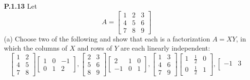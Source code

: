 \documentclass[12pt]{amsart}
\begin{document}
\begin{onehalfspace}
        \noindent\textbf{P.1.13} Let
        \begin{displaymath}
            A = \left[
                \begin{matrix}
                    1 & 2 & 3 \\
                    4 & 5 & 6 \\
                    7 & 8 & 9
                \end{matrix}
            \right]
        \end{displaymath}
        (a) Choose two of the following and show that each is a factorization $A = XY$, in which the columns of $X$ and
        rows of $Y$ are each linearly independent:
        \begin{displaymath}
            \left[\begin{matrix}
                      1 & 2 \\
                      4 & 5 \\
                      7 & 8
            \end{matrix}\right]
            \left[\begin{matrix}
                      1 & 0 & -1 \\
                      0 & 1 & 2
            \end{matrix}\right],
            \left[\begin{matrix}
                      2 & 3 \\
                      5 & 6 \\
                      8 & 9
            \end{matrix}\right]
            \left[\begin{matrix}
                      2 & 1 & 0 \\
                      -1 & 0 & 1
            \end{matrix}\right],
            \left[\begin{matrix}
                      1 & 3 \\
                      4 & 6 \\
                      7 & 9
            \end{matrix}\right]
            \left[\begin{matrix}
                      1 & \frac{1}{2} & 0 \\
                      0 & \frac{1}{2} & 1
            \end{matrix}\right],
            \left[\begin{matrix}
                      -1 & 3 \\

\end{matrix}
\end{displaymath}
\end{onehalfspace}
\end{document}
